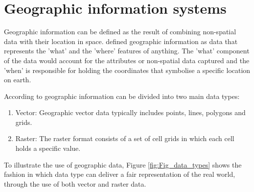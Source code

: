 \documentclass[12pt, a4paper]{report}
\begin{document}












\section{Geographic information systems}

Geographic information can be defined as the result of combining non-spatial data with their location in space. \cite{longleyGeographicInformationScience2015} defined geographic information as data that represents the 'what' and the 'where' features of anything. The 'what' component of the data would account for the attributes or non-spatial data captured and the 'when' is responsible for holding the coordinates that symbolise a specific location on earth.

According to \cite{maclachlanAppliedGeographicInformation2022} geographic information can be divided into two main data types:

\begin{enumerate}
  \item Vector: Geographic vector data typically includes points, lines, polygons and grids.
  \item Raster: The raster format consists of a set of cell grids in which each cell holds a specific value. 
\end{enumerate}

To illustrate the use of geographic data, Figure \ref{fig:Fig_data_types} shows the fashion in which data type can deliver a fair representation of the real world, through the use of both vector and raster data.
\end{document}
